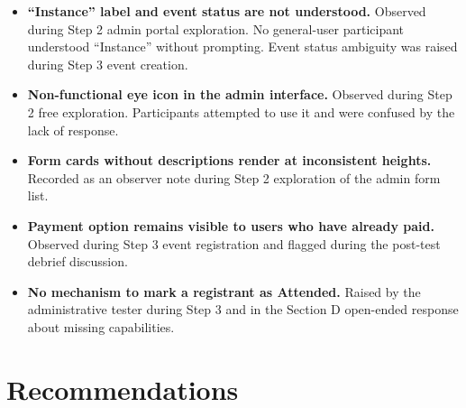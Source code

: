 \documentclass[12pt]{article}
\begin{document}
\begin{itemize}
    \item \textbf{``Instance'' label and event status are not understood.} Observed during Step 2 admin portal exploration. No general-user participant understood ``Instance'' without prompting. Event status ambiguity was raised during Step 3 event creation.

    \item \textbf{Non-functional eye icon in the admin interface.} Observed during Step 2 free exploration. Participants attempted to use it and were confused by the lack of response.

    \item \textbf{Form cards without descriptions render at inconsistent heights.} Recorded as an observer note during Step 2 exploration of the admin form list.

    \item \textbf{Payment option remains visible to users who have already paid.} Observed during Step 3 event registration and flagged during the post-test debrief discussion.

    \item \textbf{No mechanism to mark a registrant as Attended.} Raised by the administrative tester during Step 3 and in the Section D open-ended response about missing capabilities.
\end{itemize}


\section{Recommendations}
\end{document}
